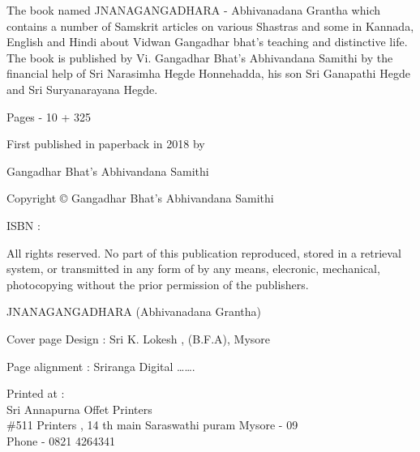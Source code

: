 The book named JNANAGANGADHARA - Abhivanadana Grantha which contains a number of Samskrit articles on various Shastras and some in Kannada, English and Hindi about Vidwan Gangadhar bhat’s teaching and  distinctive life. The book is published by Vi. Gangadhar Bhat’s Abhivandana Samithi by the financial help of Sri Narasimha Hegde Honnehadda, his son Sri Ganapathi Hegde and Sri Suryanarayana Hegde.

\bigskip
Pages - 10 + 325

\bigskip
First published in paperback in 2018 by

\bigskip
Gangadhar Bhat’s Abhivandana Samithi

\bigskip
Copyright © Gangadhar Bhat’s Abhivandana Samithi

\bigskip
ISBN :

\bigskip
All rights reserved. No part of this publication reproduced, stored in a retrieval system, or transmitted in any form of by any means, elecronic, mechanical, photocopying without the prior permission of the publishers.
 
JNANAGANGADHARA
(Abhivanadana Grantha)
\vfill
 
 
 
 
 
 
 
 
  
\bigskip
Cover page Design : Sri K. Lokesh , (B.F.A), Mysore

\bigskip
Page alignment : Sriranga Digital …….

\bigskip
Printed at :\\
Sri Annapurna Offet Printers\\
\#511 Printers , 14 th main Saraswathi puram Mysore - 09\\
Phone - 0821 4264341

